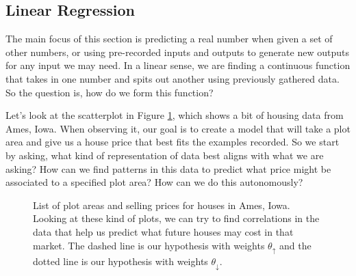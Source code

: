 \def\tu{\vec\theta_{\uparrow}}
\def\td{\vec\theta_{\downarrow}}

\subsection{Linear Regression}




The main focus of this section is predicting a real number when given a set of
other numbers, or using pre-recorded inputs and outputs to generate new outputs
for any input we may need. In a linear sense, we are finding a continuous
function that takes in one number and spits out another using previously
gathered data. So the question is, how do we form this function?


Let's look at the scatterplot in Figure \ref{fig:hp}, which shows a bit of
housing data from Ames, Iowa. When observing it, our goal is to create a model
that will take a plot area and give us a house price that best fits the examples
recorded. So we start by asking, what kind of representation of data best aligns
with what we are asking? How can we find patterns in this data to predict what
price might be associated to a specified plot area? How can we do this
autonomously?

\begin{figure}[t!]
\centering
    \caption{List of plot areas and selling prices for houses in Ames, Iowa.
    Looking at these kind of plots, we can try to find correlations in the data
    that help us predict what future houses may cost in that market. The dashed line is our hypothesis with weights $\theta_{\uparrow}$ and the dotted line is our hypothesis with weights $\theta_{\downarrow}$.}
    \label{fig:hp}
\end{figure}

